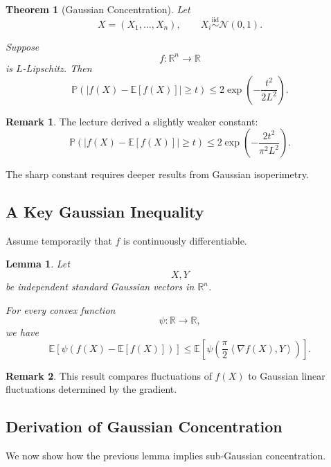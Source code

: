 \documentclass[12pt,oneside]{book}
\numberwithin{equation}{section}
\theoremstyle{definition}
\newtheorem{remark}{Remark}[section]
\theoremstyle{plain}
\newtheorem{theorem}{Theorem}[section]
\newtheorem{lemma}{Lemma}[section]
\theoremstyle{remark}
\newcommand{\R}{\mathbb{R}}
\newcommand{\E}{\mathbb{E}}
\newcommand{\Prob}{\mathbb{P}}
\newcommand{\iid}{\overset{\text{iid}}{\sim}}
\newcommand{\inner}[2]{\left\langle #1, #2 \right\rangle}
\newcommand{\grad}{\nabla}
\newcommand{\Normal}{\mathcal{N}}
\begin{document}
\begin{theorem}[Gaussian Concentration]
Let
\[
X=(X_1,\dots,X_n),
\qquad
X_i\iid \Normal(0,1).
\]

Suppose
\[
f:\R^n\to\R
\]
is $L$-Lipschitz. Then
\[
\Prob\left(
|f(X)-\E[f(X)]|
\geq t
\right)
\leq
2\exp\left(
-\frac{t^2}{2L^2}
\right).
\]
\end{theorem}

\begin{remark}
The lecture derived a slightly weaker constant:
\[
\Prob\left(
|f(X)-\E[f(X)]|
\geq t
\right)
\leq
2\exp\left(
-\frac{2t^2}{\pi^2L^2}
\right).
\]

The sharp constant requires deeper results from Gaussian isoperimetry.
\end{remark}

\subsection{A Key Gaussian Inequality}

Assume temporarily that $f$ is continuously differentiable.

\begin{lemma}
Let
\[
X,Y
\]
be independent standard Gaussian vectors in $\R^n$.

For every convex function
\[
\psi:\R\to\R,
\]
we have
\[
\E\left[
\psi(f(X)-\E[f(X)])
\right]
\leq
\E\left[
\psi\left(
\frac{\pi}{2}\inner{\grad f(X)}{Y}
\right)
\right].
\]
\end{lemma}

\begin{remark}
This result compares fluctuations of $f(X)$ to Gaussian linear fluctuations determined by the gradient.
\end{remark}

\subsection{Derivation of Gaussian Concentration}

We now show how the previous lemma implies sub-Gaussian concentration.
\end{document}
